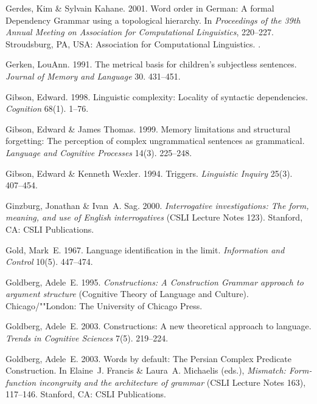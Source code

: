 \begin{thebibliography}{1420}
Gerdes, Kim \& Sylvain Kahane. 2001.
\newblock Word order in {German}: {A} formal {Dependency Grammar} using a
  topological hierarchy.
\newblock In \emph{Proceedings of the {39th Annual Meeting on Association for
  Computational Linguistics}}, 220--227. Stroudsburg, PA, USA: Association for
  Computational Linguistics.
\newblock {}.

Gerken, LouAnn. 1991.
\newblock The metrical basis for children's subjectless sentences.
\newblock \emph{Journal of Memory and Language} 30. 431--451.

Gibson, Edward. 1998.
\newblock Linguistic complexity: {Locality} of syntactic dependencies.
\newblock \emph{Cognition} 68(1). 1--76.

Gibson, Edward \& James Thomas. 1999.
\newblock Memory limitations and structural forgetting: {The} perception of
  complex ungrammatical sentences as grammatical.
\newblock \emph{Language and Cognitive Processes} 14(3). 225--248.

Gibson, Edward \& Kenneth Wexler. 1994.
\newblock Triggers.
\newblock \emph{Linguistic Inquiry} 25(3). 407--454.

Ginzburg, Jonathan \& Ivan~A. Sag. 2000.
\newblock \emph{Interrogative investigations: {The} form, meaning, and use of
  {English} interrogatives} (CSLI Lecture Notes 123).
\newblock Stanford, CA: CSLI Publications.

Gold, Mark~E. 1967.
\newblock Language identification in the limit.
\newblock \emph{Information and Control} 10(5). 447--474.

Goldberg, Adele~E. 1995.
\newblock \emph{Constructions: {A} {Construction Grammar} approach to argument
  structure}  (Cognitive Theory of Language and Culture).
\newblock Chicago/""London: The University of Chicago Press.

Goldberg, Adele~E. 2003{}.
\newblock Constructions: {A} new theoretical approach to language.
\newblock \emph{Trends in Cognitive Sciences} 7(5). 219--224.

Goldberg, Adele~E. 2003{}.
\newblock Words by default: {The} {Persian Complex Predicate Construction}.
\newblock In Elaine~J. Francis \& Laura~A. Michaelis (eds.), \emph{Mismatch:
  Form-function incongruity and the architecture of grammar} (CSLI Lecture
  Notes 163), 117--146. Stanford, CA: CSLI Publications.


\end{thebibliography}

